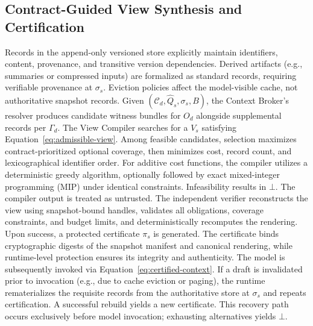 \subsection{Contract-Guided View Synthesis and Certification}
\label{sec:view-construction}
Records in the append-only versioned store explicitly maintain identifiers, content, provenance, and transitive version dependencies. Derived artifacts (e.g., summaries or compressed inputs) are formalized as standard records, requiring verifiable provenance at $\sigma_s$. Eviction policies affect the model-visible cache, not authoritative snapshot records.
Given $(\mathcal C_d,\widehat Q_s,\sigma_s,B)$, the Context Broker's resolver produces candidate witness bundles for $O_d$ alongside supplemental records per $\Gamma_d$. The View Compiler searches for a $V_s$ satisfying Equation~\eqref{eq:admissible-view}. Among feasible candidates, selection maximizes contract-prioritized optional coverage, then minimizes cost, record count, and lexicographical identifier order. For additive cost functions, the compiler utilizes a deterministic greedy algorithm, optionally followed by exact mixed-integer programming (MIP) under identical constraints. Infeasibility results in $\bot$.
The compiler output is treated as untrusted. The independent verifier reconstructs the view using snapshot-bound handles, validates all obligations, coverage constraints, and budget limits, and deterministically recomputes the rendering. Upon success, a protected certificate $\pi_s$ is generated. The certificate binds cryptographic digests of the snapshot manifest and canonical rendering, while runtime-level protection ensures its integrity and authenticity. The model is subsequently invoked via Equation~\eqref{eq:certified-context}.
If a draft is invalidated prior to invocation (e.g., due to cache eviction or paging), the runtime rematerializes the requisite records from the authoritative store at $\sigma_s$ and repeats certification. A successful rebuild yields a new certificate. This recovery path occurs exclusively before model invocation; exhausting alternatives yields $\bot$.
